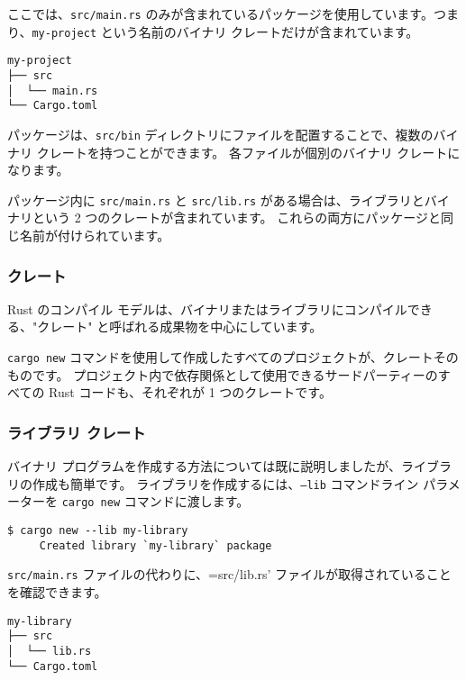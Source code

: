 ここでは、\texttt{src/main.rs} のみが含まれているパッケージを使用しています。つまり、\texttt{my-project} という名前のバイナリ クレートだけが含まれています。

\begin{lstlisting}[numbers=none]
my-project
├── src
│  └── main.rs
└── Cargo.toml
\end{lstlisting}



パッケージは、\texttt{src/bin} ディレクトリにファイルを配置することで、複数のバイナリ クレートを持つことができます。 各ファイルが個別のバイナリ クレートになります。

パッケージ内に \texttt{src/main.rs} と \texttt{src/lib.rs} がある場合は、ライブラリとバイナリという 2 つのクレートが含まれています。 これらの両方にパッケージと同じ名前が付けられています。

\subsubsection{クレート}

Rust のコンパイル モデルは、バイナリまたはライブラリにコンパイルできる、"クレート" と呼ばれる成果物を中心にしています。

\texttt{cargo new} コマンドを使用して作成したすべてのプロジェクトが、クレートそのものです。 プロジェクト内で依存関係として使用できるサードパーティーのすべての Rust コードも、それぞれが 1 つのクレートです。

\subsubsection{ライブラリ クレート}

バイナリ プログラムを作成する方法については既に説明しましたが、ライブラリの作成も簡単です。 ライブラリを作成するには、\texttt{--lib} コマンドライン パラメーターを \texttt{cargo new} コマンドに渡します。

\begin{lstlisting}[numbers=none]
$ cargo new --lib my-library
     Created library `my-library` package
\end{lstlisting}

\texttt{src/main.rs} ファイルの代わりに、=src/lib.rs' ファイルが取得されていることを確認できます。

\begin{lstlisting}[numbers=none]
my-library
├── src
│  └── lib.rs
└── Cargo.toml
\end{lstlisting}

